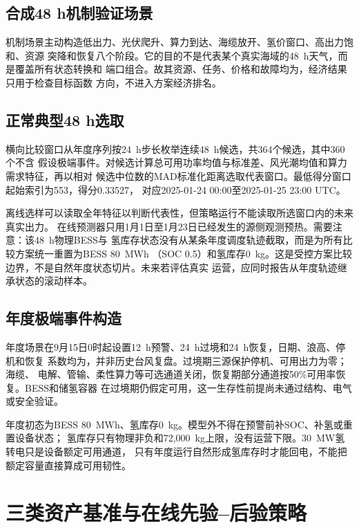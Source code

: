 \subsection{合成48 h机制验证场景}

机制场景主动构造低出力、光伏爬升、算力到达、海缆放开、氢价窗口、高出力饱和、资源
突降和恢复八个阶段。它的目的不是代表某个真实海域的48~h天气，而是覆盖所有状态转换和
端口组合。故其资源、任务、价格和故障均为\assumptiontag，经济结果只用于检查目标函数
方向，不进入方案经济排名。

\subsection{正常典型48 h选取}

横向比较窗口从年度序列按24~h步长枚举连续48~h候选，共364个候选，其中360个不含
假设极端事件。对候选计算总可用功率均值与标准差、风光潮均值和算力需求特征，再以相对
候选中位数的MAD标准化距离选取代表窗口。最低得分窗口起始索引为553，得分0.33527，
对应2025-01-24 00:00至2025-01-25 23:00 UTC。

离线选样可以读取全年特征以判断代表性，但策略运行不能读取所选窗口内的未来真实出力。
在线预测器只用1月1日至1月23日已经发生的源侧观测预热。需要注意：该48~h物理BESS与
氢库存状态没有从某条年度调度轨迹截取，而是为所有比较方案统一重置为BESS 80~MWh
（SOC 0.5）和氢库存0~kg。这是受控方案比较边界，不是自然年度状态切片。未来若评估真实
运营，应同时报告从年度轨迹继承状态的滚动样本。

\subsection{年度极端事件构造}

年度场景在9月15日0时起设置12~h预警、24~h过境和24~h恢复，日期、浪高、停机和恢复
系数均为\assumptiontag，并非历史台风复盘。过境期三源保护停机、可用出力为零；海缆、
电解、管输、柔性算力等可选通道关闭，恢复期部分通道按50\%可用率恢复。BESS和储氢容器
在过境期仍假定可用，这一生存性前提尚未通过结构、电气或安全验证。

年度初态为BESS 80~MWh、氢库存0~kg。模型外不得在预警前补SOC、补氢或重置设备状态；
氢库存只有物理非负和72,000~kg上限，没有运营下限。30~MW氢转电只是设备额定可用通道，
只有年度运行自然形成氢库存时才能回电，不能把额定容量直接算成可用韧性。

\section{三类资产基准与在线先验--后验策略}


